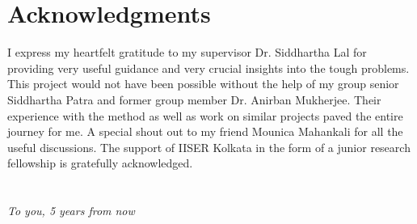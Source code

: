 \documentclass[twoside]{report}
\numberwithin{equation}{section}
\begin{document}
\chapter*{Acknowledgments}
I express my heartfelt gratitude to my supervisor Dr. Siddhartha Lal for providing very useful guidance and very crucial insights into the tough problems. This project would not have been possible without the help of my group senior Siddhartha Patra and former group member Dr. Anirban Mukherjee. Their experience with the method as well as work on similar projects paved the entire journey for me. A special shout out to my friend Mounica Mahankali for all the useful discussions. The support of IISER Kolkata in the form of a junior research fellowship is gratefully acknowledged.

\chapter*{}
\begin{center}
	\vspace*{100pt}
	\Large{\textit{To you, 5 years from now}}
\end{center}
\end{document}
